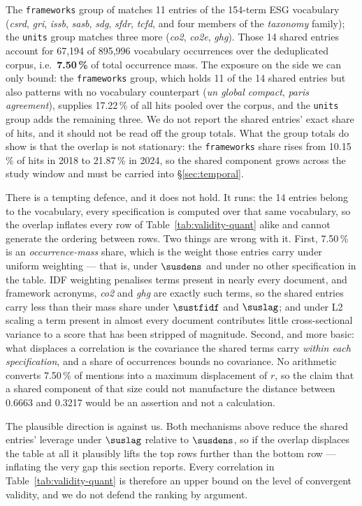 The \texttt{frameworks} group of \QUANT{} matches 11 entries of the 154-term ESG vocabulary
(\emph{csrd}, \emph{gri}, \emph{issb}, \emph{sasb}, \emph{sdg}, \emph{sfdr}, \emph{tcfd},
and four members of the \emph{taxonomy} family); the \texttt{units} group matches three more
(\emph{co2}, \emph{co2e}, \emph{ghg}). Those 14 shared entries account for 67{,}194 of
895{,}996 vocabulary occurrences over the deduplicated corpus, i.e.\ \textbf{7.50\,\%} of
total \SUS{} occurrence mass.
The exposure on the \QUANT{} side we can only bound: the \texttt{frameworks} group, which
holds 11 of the 14 shared entries but also patterns with no vocabulary counterpart
(\emph{un global compact}, \emph{paris agreement}), supplies 17.22\,\% of all \QUANT{} hits
pooled over the corpus, and the \texttt{units} group adds the remaining three. We do not
report the shared entries' exact share of \QUANT{} hits, and it should not be read off the
group totals. What the group totals do show is that the overlap is not stationary: the
\texttt{frameworks} share rises from 10.15\,\% of \QUANT{} hits in 2018 to 21.87\,\% in
2024, so the shared component grows across the study window and must be carried into
\S\ref{sec:temporal}.

There is a tempting defence, and it does not hold. It runs: the 14 entries belong to the
vocabulary, every specification is computed over that same vocabulary, so the overlap
inflates every row of Table~\ref{tab:validity-quant} alike and cannot generate the ordering
between rows. Two things are wrong with it. First, 7.50\,\% is an \emph{occurrence-mass}
share, which is the weight those entries carry under uniform weighting --- that is, under
$\susdens$ and under no other specification in the table. IDF weighting penalises terms
present in nearly every document, and framework acronyms, \emph{co2} and \emph{ghg} are
exactly such terms, so the shared entries carry less than their mass share under
$\sustfidf$ and $\suslag$; and under L2 scaling a term present in almost every document
contributes little cross-sectional variance to a score that has been stripped of magnitude.
Second, and more basic: what displaces a correlation is the covariance the shared terms
carry \emph{within each specification}, and a share of occurrences bounds no covariance. No
arithmetic converts 7.50\,\% of mentions into a maximum displacement of $r$, so the claim
that a shared component of that size could not manufacture the distance between 0.6663 and
0.3217 would be an assertion and not a calculation.

The plausible direction is against us. Both mechanisms above reduce the shared entries'
leverage under $\suslag$ relative to $\susdens$, so if the overlap displaces the table at
all it plausibly lifts the top rows further than the bottom row --- inflating the very gap
this section reports. Every correlation in Table~\ref{tab:validity-quant} is therefore an
upper bound on the level of convergent validity, and we do not defend the ranking by
argument.

